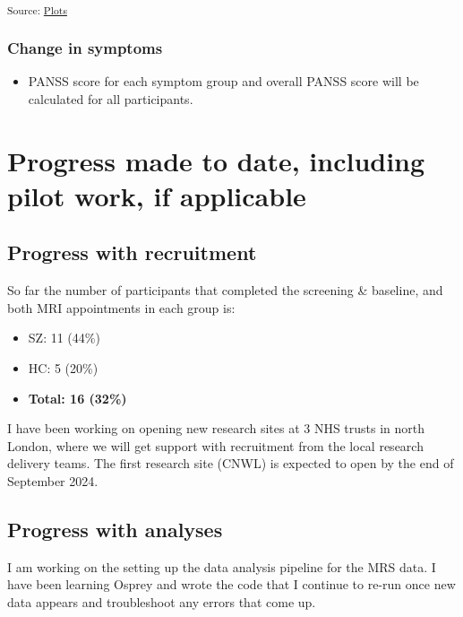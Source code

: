 \documentclass[
  letterpaper,
  DIV=11,
  numbers=noendperiod]{scrartcl}
\providecommand{\tightlist}{%
  \setlength{\itemsep}{0pt}\setlength{\parskip}{0pt}}\usepackage{longtable,booktabs,array}
\begin{document}
\textsubscript{Source:
\href{https://juliam98.github.io/phd-upgrade-proposal/notebooks/plots-preview.html\#cell-fig-lev_hc_vs_sz}{Plots}}

\subsubsection{Change in symptoms}\label{change-in-symptoms}

\begin{itemize}
\tightlist
\item
  PANSS score for each symptom group and overall PANSS score will be
  calculated for all participants.
\end{itemize}

\section{Progress made to date, including pilot work, if
applicable}\label{progress-made-to-date-including-pilot-work-if-applicable}

\subsection{Progress with recruitment}\label{progress-with-recruitment}

So far the number of participants that completed the screening \&
baseline, and both MRI appointments in each group is:

\begin{itemize}
\tightlist
\item
  SZ: 11 (44\%)
\item
  HC: 5 (20\%)
\item
  \textbf{Total: 16 (32\%)}
\end{itemize}

I have been working on opening new research sites at 3 NHS trusts in
north London, where we will get support with recruitment from the local
research delivery teams. The first research site (CNWL) is expected to
open by the end of September 2024.

\subsection{Progress with analyses}\label{progress-with-analyses}

I am working on the setting up the data analysis pipeline for the MRS
data. I have been learning Osprey and wrote the code that I continue to
re-run once new data appears and troubleshoot any errors that come up.
\end{document}
